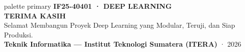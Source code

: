 \documentclass[t,aspectratio=169,xcolor=dvipsnames]{beamer}
\begin{document}
\begin{frame}[plain]
  \begin{beamercolorbox}[wd=\paperwidth,ht=0.96\paperheight,sep=0.8cm]{palette primary}
    \vspace{1.0cm}
    {\scriptsize\bfseries\color{dlMute}IF25-40401 · DEEP LEARNING}\\[0.4cm]
    {\Huge\bfseries TERIMA KASIH}\\[0.4cm]
    {\small Selamat Membangun Proyek Deep Learning yang Modular, Teruji, dan Siap Produksi.}\\[0.8cm]
    \vfill
    {\scriptsize\textbf{Teknik Informatika — Institut Teknologi Sumatera (ITERA)} · 2026}
  \end{beamercolorbox}
\end{frame}
\end{document}

